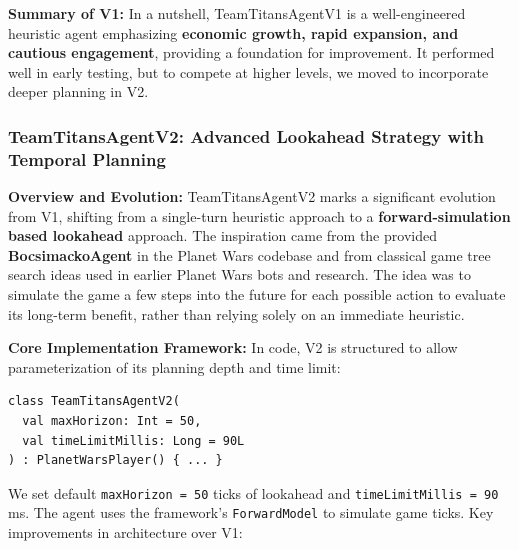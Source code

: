\documentclass[conference]{IEEEtran}
\begin{document}
\textbf{Summary of V1:} In a nutshell, TeamTitansAgentV1 is a well-engineered heuristic agent emphasizing \textbf{economic growth, rapid expansion, and cautious engagement}, providing a foundation for improvement. It performed well in early testing, but to compete at higher levels, we moved to incorporate deeper planning in V2.

\subsubsection{TeamTitansAgentV2: Advanced Lookahead Strategy with Temporal Planning}

\textbf{Overview and Evolution:} TeamTitansAgentV2 marks a significant evolution from V1, shifting from a single-turn heuristic approach to a \textbf{forward-simulation based lookahead} approach. The inspiration came from the provided \textbf{BocsimackoAgent} in the Planet Wars codebase and from classical game tree search ideas used in earlier Planet Wars bots and research. The idea was to simulate the game a few steps into the future for each possible action to evaluate its long-term benefit, rather than relying solely on an immediate heuristic.

\textbf{Core Implementation Framework:} In code, V2 is structured to allow parameterization of its planning depth and time limit:

\begin{scriptsize}
\raggedright
\begin{verbatim}
class TeamTitansAgentV2(
  val maxHorizon: Int = 50,
  val timeLimitMillis: Long = 90L
) : PlanetWarsPlayer() { ... }
\end{verbatim}
\end{scriptsize}

We set default \texttt{maxHorizon = 50} ticks of lookahead and \texttt{timeLimitMillis = 90} ms. The agent uses the framework's \texttt{ForwardModel} to simulate game ticks. Key improvements in architecture over V1:
\end{document}
